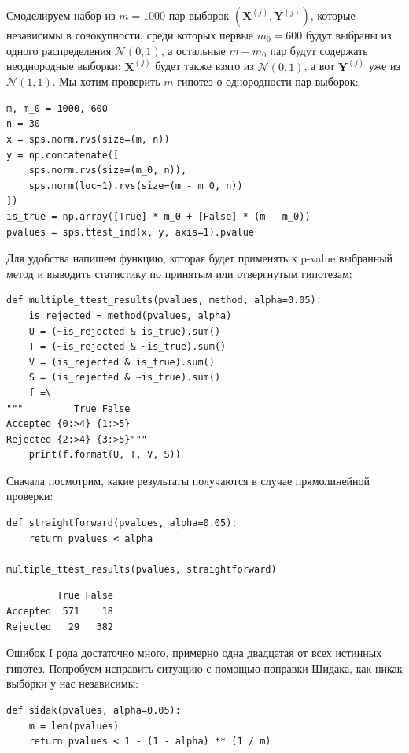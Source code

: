 \begin{example}
    Смоделируем набор из $m = 1000$ пар выборок $(\mathbf X^{(j)}, \mathbf Y^{(j)})$, которые независимы в совокупности, среди которых первые $m_0 = 600$ будут выбраны из одного распределения $\mathcal{N}(0, 1)$, а остальные $m - m_0$ пар будут содержать неоднородные выборки: $\mathbf X^{(j)}$ будет также взято из $\mathcal{N}(0, 1)$, а вот $\mathbf Y^{(j)}$ уже из $\mathcal{N}(1, 1)$. Мы хотим проверить $m$ гипотез о однородности пар выборок:
    \begin{verbatim}
m, m_0 = 1000, 600
n = 30
x = sps.norm.rvs(size=(m, n))
y = np.concatenate([
    sps.norm.rvs(size=(m_0, n)),
    sps.norm(loc=1).rvs(size=(m - m_0, n))
])
is_true = np.array([True] * m_0 + [False] * (m - m_0))
pvalues = sps.ttest_ind(x, y, axis=1).pvalue
    \end{verbatim}
    Для удобства напишем функцию, которая будет применять к p-value выбранный метод и выводить статистику по принятым или отвергнутым гипотезам:
    \begin{verbatim}
def multiple_ttest_results(pvalues, method, alpha=0.05):
    is_rejected = method(pvalues, alpha)
    U = (~is_rejected & is_true).sum()
    T = (~is_rejected & ~is_true).sum()
    V = (is_rejected & is_true).sum()
    S = (is_rejected & ~is_true).sum()
    f =\
"""         True False
Accepted {0:>4} {1:>5}
Rejected {2:>4} {3:>5}"""
    print(f.format(U, T, V, S))
    \end{verbatim}
    Сначала посмотрим, какие результаты получаются в случае прямолинейной проверки:
    \begin{verbatim}
def straightforward(pvalues, alpha=0.05):
    return pvalues < alpha

multiple_ttest_results(pvalues, straightforward)
    \end{verbatim}
    \begin{lstlisting}
         True False
Accepted  571    18
Rejected   29   382
    \end{lstlisting}
    Ошибок I рода достаточно много, примерно одна двадцатая от всех истинных гипотез. Попробуем исправить ситуацию с помощью поправки Шидака, как-никак выборки у нас независимы:
    \begin{verbatim}
def sidak(pvalues, alpha=0.05):
    m = len(pvalues)
    return pvalues < 1 - (1 - alpha) ** (1 / m)


\end{verbatim}
\end{example}
